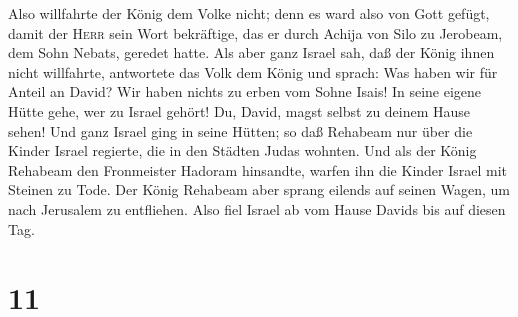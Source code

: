  Also willfahrte der König dem Volke nicht; denn es ward
also von Gott gefügt, damit der \textsc{Herr} sein Wort bekräftige, das
er durch Achija von Silo zu Jerobeam, dem Sohn Nebats, geredet hatte.
 Als aber ganz Israel sah, daß der König ihnen nicht
willfahrte, antwortete das Volk dem König und sprach: Was haben wir für
Anteil an David? Wir haben nichts zu erben vom Sohne Isais! In seine
eigene Hütte gehe, wer zu Israel gehört! Du, David, magst selbst zu
deinem Hause sehen! Und ganz Israel ging in seine Hütten;
 so daß Rehabeam nur über die Kinder Israel regierte, die
in den Städten Judas wohnten.  Und als der König Rehabeam
den Fronmeister Hadoram hinsandte, warfen ihn die Kinder Israel mit
Steinen zu Tode. Der König Rehabeam aber sprang eilends auf seinen
Wagen, um nach Jerusalem zu entfliehen.  Also fiel Israel
ab vom Hause Davids bis auf diesen Tag.

\hypertarget{section-10}{%
\section{11}\label{section-10}}

